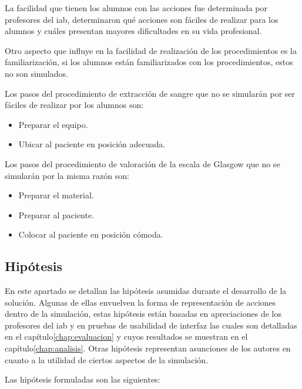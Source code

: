 \begin{itemize}
    La facilidad que tienen los alumnos con las acciones fue determinada por
    profesores del \Gls{iab}, determinaron qué acciones son fáciles de
    realizar para los alumnos y cuáles presentan mayores dificultades en su
    vida profesional.

    Otro aspecto que influye en la facilidad de realización de los
    procedimientos es la familiarización, si los alumnos están
    familiarizados con los procedimientos, estos no son simulados.
        
    Los pasos del procedimiento de extracción de sangre que no se simularán por 
    ser fáciles de realizar por los alumnos son:
        
    \begin{itemize}
        \item Preparar el equipo.
        \item Ubicar al paciente en posición adecuada.
    \end{itemize}
    
    Los pasos del procedimiento de valoración de la escala de Glasgow 
    que no se simularán por la misma razón son:
    \begin{itemize}
    \item Preparar el material.
    \item Preparar al paciente.
    \item Colocar al paciente en posición cómoda.
    \end{itemize}
        
\end{itemize}

\subsection{Hipótesis}
\label{sec:hipotesis}

En este apartado se detallan las hipótesis asumidas durante el desarrollo de 
la solución. Algunas de ellas envuelven la forma de representación de acciones 
dentro de la simulación, estas hipótesis están  basadas en apreciaciones de los 
profesores del \Gls{iab} y en pruebas de usabilidad de interfaz las cuales son 
detalladas en el capítulo\ref{chap:evaluacion} y cuyos resultados se muestran en el capítulo\ref{chap:analisis}. Otras hipótesis representan asunciones de los autores 
en cuanto a la utilidad de ciertos aspectos de la simulación.

Las hipótesis formuladas son las siguientes:

